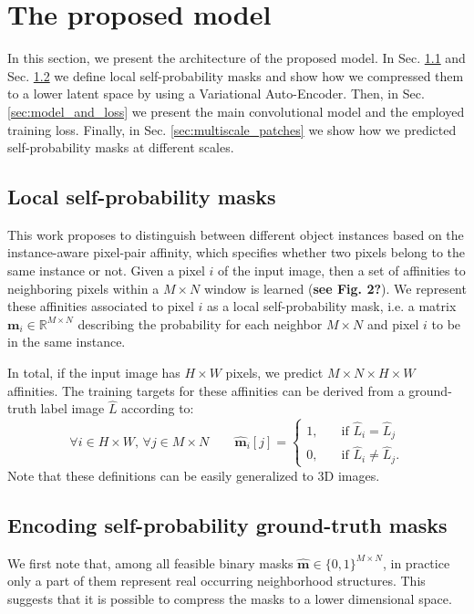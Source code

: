 
\section{The proposed model}\label{sec:model}

In this section, we present the architecture of the proposed model. In Sec. \ref{sec:self_masks} and Sec. \ref{sec:encoding_masks} we define local self-probability masks and show how we compressed them to a lower latent space by using a Variational Auto-Encoder. Then, in Sec. \ref{sec:model_and_loss} we present the main convolutional model and the employed training loss. Finally, in Sec. \ref{sec:multiscale_patches} we show how we predicted self-probability masks at different scales.

\subsection{Local self-probability masks}\label{sec:self_masks}
This work proposes to distinguish between different object instances based on the instance-aware pixel-pair affinity, which specifies whether two pixels belong to the same instance or not.
Given a pixel $i$ of the input image, then a set of affinities to neighboring pixels within a $M\times N$ window is learned (\textbf{see Fig. 2?}). We represent these affinities associated to pixel $i$ as a local self-probability mask, i.e. a matrix $\mathbf{m}_i \in \mathbb{R}^{M\times N}$ describing the probability for each neighbor $M\times N$ and pixel $i$ to be in the same instance.

In total, if the input image has $H\times W$ pixels, we predict $M\times N \times H \times W$ affinities. The training targets for these affinities can be derived from a ground-truth label image $\hat{L}$ according to:
\begin{equation}
\forall i\in H\times W, \, \forall j\in M\times N \qquad \hat{\mathbf{m}}_i[j] = 
\begin{cases}
1, \quad &\text{if } \hat{L}_i = \hat{L}_j \\
0, \quad &\text{if } \hat{L}_i \neq \hat{L}_j. 
\end{cases}
\end{equation}
Note that these definitions can be easily generalized to 3D images.

\subsection{Encoding self-probability ground-truth masks}\label{sec:encoding_masks}
We first note that, among all feasible binary masks $\hat{\mathbf{m}} \in \{0,1\}^{M\times N}$, in practice only a part of them represent real occurring neighborhood structures. 
This suggests that it is possible to compress the masks to a lower dimensional space. 

